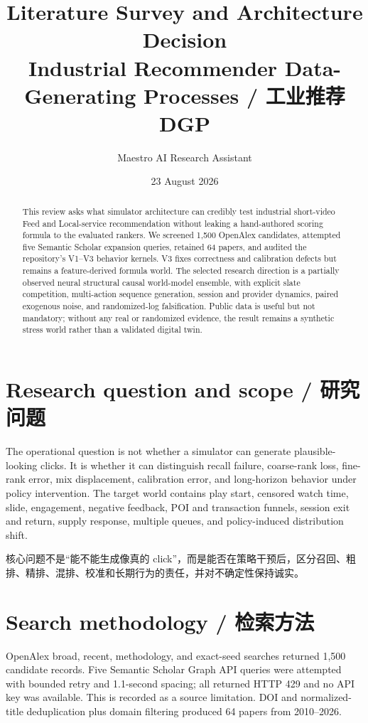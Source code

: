 \documentclass[10.5pt,a4paper]{article}
\title{Literature Survey and Architecture Decision\\[0.4em]
\large Industrial Recommender Data-Generating Processes / 工业推荐 DGP}
\author{Maestro AI Research Assistant}
\date{23 August 2026}
\begin{document}
\maketitle

\begin{abstract}
This review asks what simulator architecture can credibly test industrial short-video Feed and Local-service recommendation without leaking a hand-authored scoring formula to the evaluated rankers. We screened 1,500 OpenAlex candidates, attempted five Semantic Scholar expansion queries, retained 64 papers, and audited the repository's V1--V3 behavior kernels. V3 fixes correctness and calibration defects but remains a feature-derived formula world. The selected research direction is a partially observed neural structural causal world-model ensemble, with explicit slate competition, multi-action sequence generation, session and provider dynamics, paired exogenous noise, and randomized-log falsification. Public data is useful but not mandatory; without any real or randomized evidence, the result remains a synthetic stress world rather than a validated digital twin.
\end{abstract}

\section{Research question and scope / 研究问题}

The operational question is not whether a simulator can generate plausible-looking clicks. It is whether it can distinguish recall failure, coarse-rank loss, fine-rank error, mix displacement, calibration error, and long-horizon behavior under policy intervention. The target world contains play start, censored watch time, slide, engagement, negative feedback, POI and transaction funnels, session exit and return, supply response, multiple queues, and policy-induced distribution shift.

核心问题不是“能不能生成像真的 click”，而是能否在策略干预后，区分召回、粗排、精排、混排、校准和长期行为的责任，并对不确定性保持诚实。

\section{Search methodology / 检索方法}

OpenAlex broad, recent, methodology, and exact-seed searches returned 1,500 candidate records. Five Semantic Scholar Graph API queries were attempted with bounded retry and 1.1-second spacing; all returned HTTP 429 and no API key was available. This is recorded as a source limitation. DOI and normalized-title deduplication plus domain filtering produced 64 papers from 2010--2026.
\end{document}
